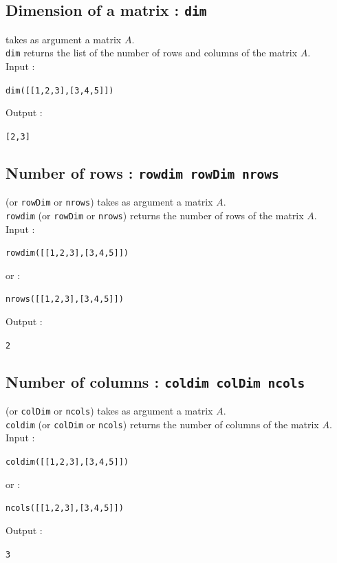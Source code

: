 \documentclass[a4paper,11pt]{book}
\begin{document}
\subsection{Dimension of a matrix : {\tt dim}}
 takes as argument a matrix $A$.\\
{\tt dim} returns the list of the number of rows and columns
of the matrix $A$.\\
Input :
\begin{center}{\tt dim([[1,2,3],[3,4,5]])}\end{center}
Output :
\begin{center}{\tt  [2,3]}\end{center}

\subsection{Number of rows : {\tt rowdim rowDim nrows}}
 (or {\tt rowDim} or {\tt nrows}) takes as argument a 
matrix $A$.\\
{\tt rowdim} (or {\tt rowDim} or {\tt nrows}) returns the number of rows of the
matrix $A$.\\
Input :
\begin{center}{\tt rowdim([[1,2,3],[3,4,5]])}\end{center}
or :
\begin{center}{\tt nrows([[1,2,3],[3,4,5]])}\end{center}
Output :
\begin{center}{\tt  2}\end{center}

\subsection{Number of columns : {\tt coldim colDim ncols}}
 (or {\tt colDim} or {\tt ncols}) takes as argument a 
matrix $A$.\\
{\tt coldim} (or {\tt colDim} or {\tt ncols}) returns the number of columns of 
the matrix $A$.\\
Input :
\begin{center}{\tt coldim([[1,2,3],[3,4,5]])}\end{center}
or :
\begin{center}{\tt ncols([[1,2,3],[3,4,5]])}\end{center}
Output :
\begin{center}{\tt  3}\end{center}
\end{document}
